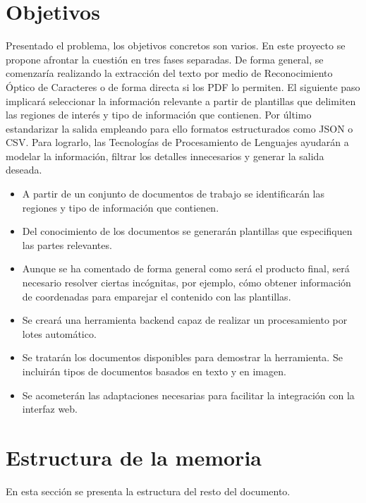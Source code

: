 \section{Objetivos} 

Presentado el problema, los objetivos concretos son varios. En este proyecto se propone afrontar la cuestión en tres fases separadas. De forma general, se comenzaría realizando la extracción del texto por medio de Reconocimiento Óptico de Caracteres o de forma directa si los PDF lo permiten. El siguiente paso implicará seleccionar la información relevante a partir de plantillas que delimiten las regiones de interés y tipo de información que contienen. Por último estandarizar la salida empleando para ello formatos estructurados como JSON o CSV. Para lograrlo, las Tecnologías de Procesamiento de Lenguajes ayudarán a modelar la información, filtrar los detalles innecesarios y generar la salida deseada.

\begin{itemize}
    \item A partir de un conjunto de documentos de trabajo se identificarán las regiones y tipo de información que contienen.
    \item Del conocimiento de los documentos se generarán plantillas que especifiquen las partes relevantes.
    \item Aunque se ha comentado de forma general como será el producto final, será necesario resolver ciertas incógnitas, por ejemplo, cómo obtener información de coordenadas para emparejar el contenido con las plantillas.
    \item Se creará una herramienta backend capaz de realizar un procesamiento por lotes automático.
    \item Se tratarán los documentos disponibles para demostrar la herramienta. Se incluirán tipos de documentos basados en texto y en imagen.
    \item Se acometerán las adaptaciones necesarias para facilitar la integración con la interfaz web.
\end{itemize}

\section{Estructura de la memoria}

En esta sección se presenta la estructura del resto del documento.

